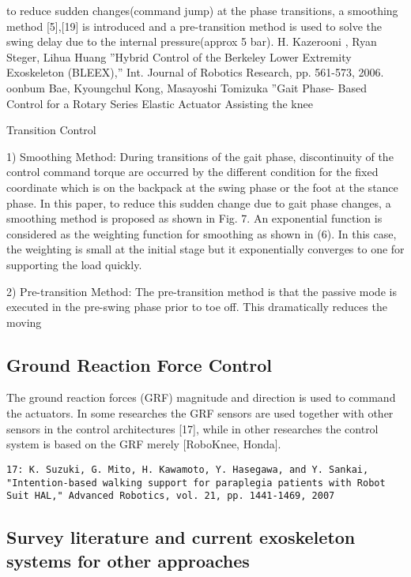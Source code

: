 \documentclass[letterpaper,12pt,fullpage]{article}
\begin{document}
to reduce
sudden changes(command jump) at the phase transitions, a
smoothing method [5],[19] is introduced and a pre-transition
method is used to solve the swing delay due to the internal
pressure(approx 5 bar).
H. Kazerooni , Ryan Steger, Lihua Huang ”Hybrid Control of the
Berkeley Lower Extremity Exoskeleton (BLEEX),” Int. Journal of
Robotics Research, pp. 561-573, 2006.
oonbum Bae, Kyoungchul Kong, Masayoshi Tomizuka ”Gait Phase-
Based Control for a Rotary Series Elastic Actuator Assisting the knee

Transition Control

1) Smoothing Method: During transitions of the gait
phase, discontinuity of the control command torque are
occurred by the different condition for the fixed coordinate
which is on the backpack at the swing phase or the foot at
the stance phase. In this paper, to reduce this sudden change
due to gait phase changes, a smoothing method is proposed
as shown in Fig. 7. An exponential function is considered
as the weighting function for smoothing as shown in (6).
In this case, the weighting is small at the initial stage but
it exponentially converges to one for supporting the load
quickly.

2) Pre-transition Method: The pre-transition method is
that the passive mode is executed in the pre-swing phase
prior to toe off. This dramatically reduces the moving

\subsection{Ground Reaction Force Control}

The ground reaction
forces (GRF) magnitude and direction is used to command the
actuators. In some researches the GRF sensors are used
together with other sensors in the control architectures [17],
while in other researches the control system is based on the
GRF merely [RoboKnee, Honda].
\begin{verbatim}
17: K. Suzuki, G. Mito, H. Kawamoto, Y. Hasegawa, and Y. Sankai,
"Intention-based walking support for paraplegia patients with Robot
Suit HAL," Advanced Robotics, vol. 21, pp. 1441-1469, 2007
\end{verbatim}

\subsection{Survey literature and current exoskeleton systems for other approaches}
\end{document}
